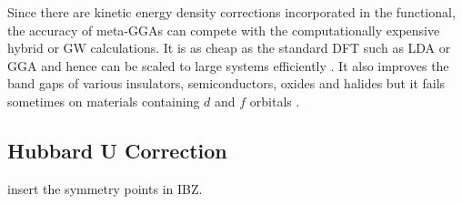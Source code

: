 Since there are kinetic energy density corrections incorporated in the functional, the accuracy of meta-GGAs can compete with the computationally expensive hybrid or GW calculations. It is as cheap as the standard DFT such as LDA or GGA and hence can be scaled to large systems efficiently \citep{Tran2009}. It also improves the band gaps of various insulators, semiconductors, oxides and halides but it fails sometimes on materials containing $d$ and $f$ orbitals \citep{Singh2010,Singh2010a}. 


\subsection{Hubbard U Correction}

	{\color{red} insert the symmetry points in IBZ.}

